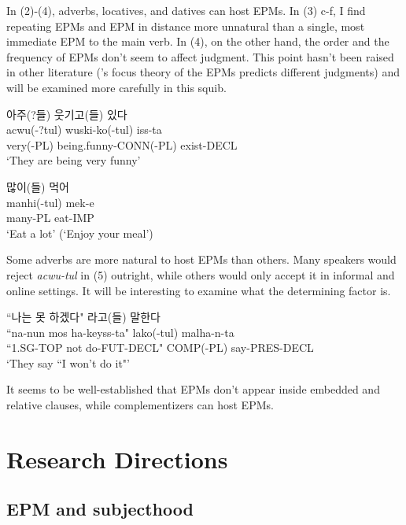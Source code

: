 \documentclass{article}
\begin{document}
In (2)-(4), adverbs, locatives, and datives can host EPMs. In (3) c-f, I find repeating EPMs and EPM in distance more unnatural than a single, most immediate EPM to the main verb. In (4), on the other hand, the order and the frequency of EPMs don't seem to affect judgment. This point hasn't been raised in other literature (\cite{SONG97}'s focus theory of the EPMs predicts different judgments) and will be examined more carefully in this squib.

\begin{exe}

\ex
\glll 아주(?들) 웃기고(들) 있다 \\ 
     acwu(-?tul) wuski-ko(-tul) iss-ta \\
     very(-PL) being.funny-CONN(-PL) exist-DECL \\
\trans `They are being very funny'

\ex
\glll 많이(들) 먹어 \\ 
     manhi(-tul) mek-e \\
     many-PL eat-IMP \\
\trans `Eat a lot' (`Enjoy your meal')

\end{exe}

Some adverbs are more natural to host EPMs than others. Many speakers would reject \textit{acwu-tul} in (5) outright, while others would only accept it in informal and online settings. It will be interesting to examine what the determining factor is.

\begin{exe}

\ex 
\glll ``나는 못 하겠다" 라고(들) 말한다 \\
     ``na-nun   mos ha-keyss-ta"   lako(-tul) malha-n-ta \\
     ``1.SG-TOP not do-FUT-DECL"   COMP(-PL)  say-PRES-DECL \\
\trans `They say ``I won't do it"'

\end{exe}

It seems to be well-established that EPMs don't appear inside embedded and relative clauses, while complementizers can host EPMs.

\section{Research Directions}

\subsection{EPM and subjecthood}
\end{document}
